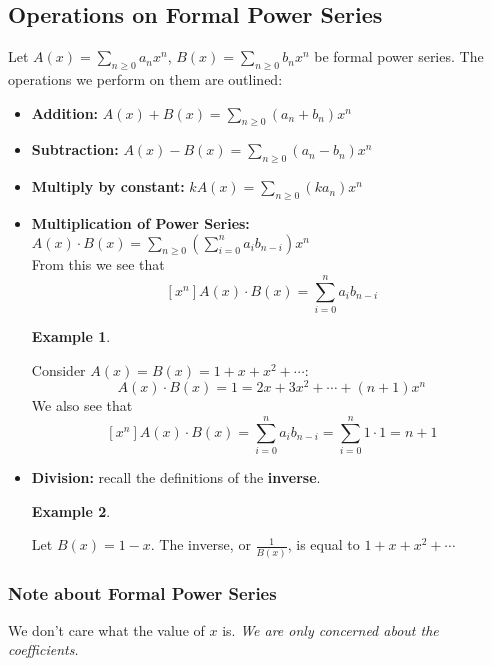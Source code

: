 \documentclass{report}
\newtheorem{ex}{Example}[section]
\begin{document}
\subsection{Operations on Formal Power Series}
Let $A(x) = \displaystyle\sum_{n \geq 0}a_nx^n$, $B(x) = \displaystyle\sum_{n \geq 0}b_nx^n$ be formal power series. The operations we perform on them are outlined:
\begin{itemize}
\item \textbf{Addition:} $A(x) + B(x) = \displaystyle\sum_{n \geq 0} (a_n + b_n)x^n$
\item \textbf{Subtraction:} $A(x) - B(x) = \displaystyle\sum_{n \geq 0} (a_n - b_n)x^n$
\item \textbf{Multiply by constant:} $kA(x) = \displaystyle\sum_{n \geq 0} (ka_n)x^n$
\item \textbf{Multiplication of Power Series:} $A(x) \cdot B(x) = \displaystyle\sum_{n \geq 0} \left(\sum_{i=0}^n a_ib_{n-i}\right)x^n$\\From this we see that $$[x^n]A(x)\cdot B(x) = \sum_{i=0}^n a_ib_{n-i}$$
\begin{ex}
\end{ex}
Consider $A(x) = B(x) = 1 + x + x^2 + \cdots$:
$$A(x) \cdot B(x) = 1 = 2x + 3x^2 + \cdots + (n+1)x^n$$ We also see that
$$[x^n]A(x)\cdot B(x) = \sum_{i=0}^n a_ib_{n-i} = \sum_{i=0}^n 1 \cdot 1 = n+1$$
\item \textbf{Division:} recall the definitions of the \textbf{inverse}.
\begin{ex}
\end{ex}
Let $B(x) = 1-x$. The inverse, or $\frac{1}{B(x)}$, is equal to $ 1 + x + x^2 + \cdots$ 
\end{itemize}
\subsubsection{Note about Formal Power Series}
We don't care what the value of $x$ is. \textit{We are only concerned about the coefficients.}
\end{document}
